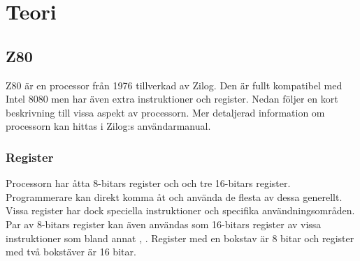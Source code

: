 \documentclass[main.tex]{subfiles}
\begin{document}
\section{Teori}
\subsection{Z80}
Z80 är en processor från 1976 tillverkad av Zilog. Den är fullt kompatibel med
Intel 8080 men har även extra instruktioner och register. Nedan följer en kort
beskrivning till vissa aspekt av processorn. Mer detaljerad information om
processorn kan hittas i Zilog:s användarmanual.\cite{z80um}

\subsubsection{Register}
    Processorn har åtta 8-bitars register och och tre 16-bitars register.
    Programmerare kan direkt komma åt och använda de flesta av dessa generellt.
    Vissa register har dock speciella instruktioner och specifika
    användningsområden. Par av 8-bitars register kan även användas som
    16-bitars register av vissa instruktioner som bland annat ,
    . Register med en bokstav är 8 bitar och register med två
    bokstäver är 16 bitar.
\end{document}
